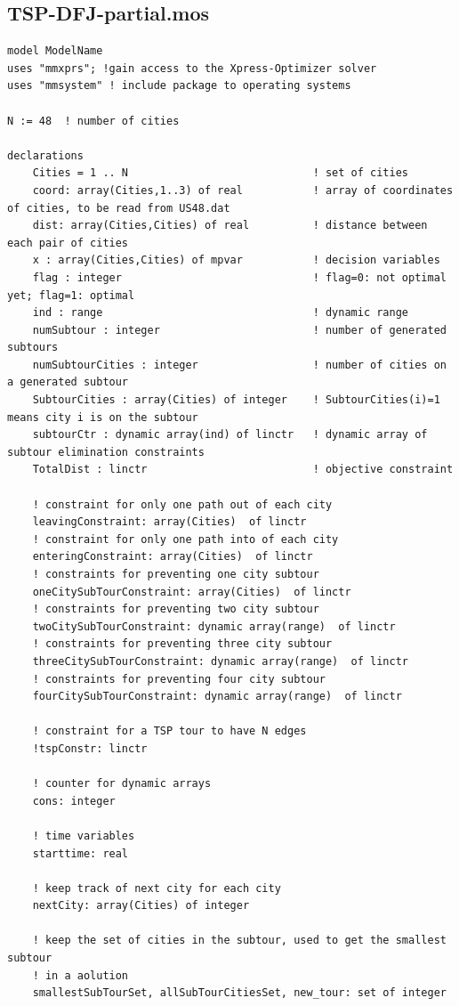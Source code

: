 \documentclass[twoside,12pt]{article}
\begin{document}
\subsection{TSP-DFJ-partial.mos}
\begin{verbatim}
model ModelName
uses "mmxprs"; !gain access to the Xpress-Optimizer solver
uses "mmsystem" ! include package to operating systems

N := 48  ! number of cities

declarations
	Cities = 1 .. N                         	! set of cities
	coord: array(Cities,1..3) of real			! array of coordinates of cities, to be read from US48.dat
	dist: array(Cities,Cities) of real  		! distance between each pair of cities
	x : array(Cities,Cities) of mpvar       	! decision variables
	flag : integer                          	! flag=0: not optimal yet; flag=1: optimal 
	ind : range                             	! dynamic range
	numSubtour : integer                    	! number of generated subtours
	numSubtourCities : integer					! number of cities on a generated subtour
	SubtourCities : array(Cities) of integer	! SubtourCities(i)=1 means city i is on the subtour 
	subtourCtr : dynamic array(ind) of linctr   ! dynamic array of subtour elimination constraints
	TotalDist : linctr    						! objective constraint
	
	! constraint for only one path out of each city
	leavingConstraint: array(Cities)  of linctr      
	! constraint for only one path into of each city
	enteringConstraint: array(Cities)  of linctr     
	! constraints for preventing one city subtour
	oneCitySubTourConstraint: array(Cities)  of linctr     
	! constraints for preventing two city subtour
	twoCitySubTourConstraint: dynamic array(range)  of linctr     
	! constraints for preventing three city subtour
	threeCitySubTourConstraint: dynamic array(range)  of linctr  
	! constraints for preventing four city subtour
	fourCitySubTourConstraint: dynamic array(range)  of linctr  
	
	! constraint for a TSP tour to have N edges
	!tspConstr: linctr
	
	! counter for dynamic arrays
	cons: integer          
	
	! time variables
	starttime: real
	 
	! keep track of next city for each city
	nextCity: array(Cities) of integer
	
	! keep the set of cities in the subtour, used to get the smallest subtour
	! in a aolution
	smallestSubTourSet, allSubTourCitiesSet, new_tour: set of integer
	

\end{verbatim}
\end{document}
